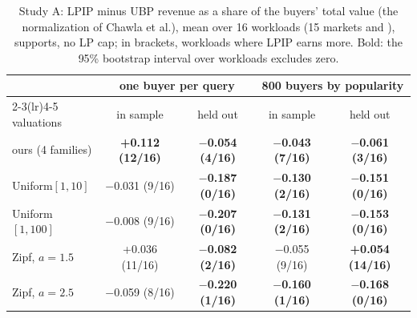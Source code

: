 
\begin{table}[t]
  \centering
  \footnotesize
  \setlength{\tabcolsep}{3pt}
  \caption{Study A: LPIP minus UBP revenue as a share of the buyers' total value (the normalization of Chawla et al.), mean over 16 workloads (15 markets and \tpch{}), \qirana{} supports, no LP cap; in brackets, workloads where LPIP earns more. Bold: the 95\% bootstrap interval over workloads excludes zero.}
  \label{tab:studyA}
  \begin{tabular}{@{}lcccc@{}}
    \toprule
    & \multicolumn{2}{c}{one buyer per query} & \multicolumn{2}{c}{800 buyers by popularity} \\
    \cmidrule(lr){2-3}\cmidrule(lr){4-5}
    valuations & in sample & held out & in sample & held out \\
    \midrule
    ours (4 families) & \textbf{+0.112 (12/16)} & \textbf{$-$0.054 (4/16)} & \textbf{$-$0.043 (7/16)} & \textbf{$-$0.061 (3/16)} \\
    Uniform$[1, 10]$ & $-$0.031 (9/16) & \textbf{$-$0.187 (0/16)} & \textbf{$-$0.130 (2/16)} & \textbf{$-$0.151 (0/16)} \\
    Uniform$[1, 100]$ & $-$0.008 (9/16) & \textbf{$-$0.207 (0/16)} & \textbf{$-$0.131 (2/16)} & \textbf{$-$0.153 (0/16)} \\
    Zipf, $a = 1.5$ & +0.036 (11/16) & \textbf{$-$0.082 (2/16)} & $-$0.055 (9/16) & \textbf{+0.054 (14/16)} \\
    Zipf, $a = 2.5$ & $-$0.059 (8/16) & \textbf{$-$0.220 (1/16)} & \textbf{$-$0.160 (1/16)} & \textbf{$-$0.168 (0/16)} \\
    \bottomrule
  \end{tabular}
\end{table}
